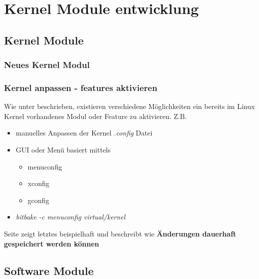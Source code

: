 
\chapter{Kernel Module entwicklung}%
\label{cha:module_entwicklung}


\section{Kernel Module}%
\label{sec:kernel_module}

\subsection{Neues Kernel Modul}%
\label{sub:neues_kernelmodul}


\subsection{Kernel anpassen - features aktivieren}%
\label{sub:kernel_anpssen_features_aktivieren}

Wie unter \cite[Seite 109]{Gonzalez2018:Embedded_Linux_Development_Using_Yocto_Project_Cookbook_2nd}
beschrieben, existieren verschiedene Möglichkeiten ein bereits im Linux Kernel
vorhandenes Modul oder \gls{Feature} zu aktivieren. Z.B.

\begin{itemize}
    \item manuelles Anpassen der Kernel \textit{.config} Datei
    \item GUI oder Menü basiert mittels
        \begin{itemize}
            \item menuconfig
            \item xconfig
            \item gconfig
        \end{itemize}
    \item \textit{bitbake -c menuconfig virtual/kernel}
\end{itemize}

Seite \cite[Seite 114 und Seite 118]{Gonzalez2018:Embedded_Linux_Development_Using_Yocto_Project_Cookbook_2nd}
zeigt letztes beispielhaft und beschreibt wie \textbf{Änderungen dauerhaft
    gespeichert werden können}


\section{Software Module}%
\label{sec:software_module}

